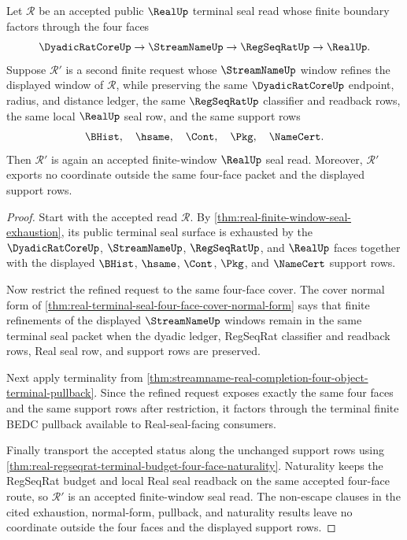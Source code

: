 \begin{theorem}
\label{thm:real-finite-window-seal-refinement-monotonicity}
Let $\mathcal R$ be an accepted public $\RealUp$ terminal seal read whose
finite boundary factors through the four faces
$$
\DyadicRatCoreUp \to \StreamNameUp \to \RegSeqRatUp \to \RealUp.
$$
Suppose $\mathcal R'$ is a second finite request whose $\StreamNameUp$ window
refines the displayed window of $\mathcal R$, while preserving the same
$\DyadicRatCoreUp$ endpoint, radius, and distance ledger, the same
$\RegSeqRatUp$ classifier and readback rows, the same local $\RealUp$ seal
row, and the same support rows
$$
\BHist,\quad \hsame,\quad \Cont,\quad \Pkg,\quad \NameCert.
$$
Then $\mathcal R'$ is again an accepted finite-window $\RealUp$ seal read.
Moreover, $\mathcal R'$ exports no coordinate outside the same four-face
packet and the displayed support rows.
\end{theorem}
\begin{proof}
Start with the accepted read $\mathcal R$. By
\autoref{thm:real-finite-window-seal-exhaustion}, its public terminal seal
surface is exhausted by the $\DyadicRatCoreUp$, $\StreamNameUp$,
$\RegSeqRatUp$, and $\RealUp$ faces together with the displayed $\BHist$,
$\hsame$, $\Cont$, $\Pkg$, and $\NameCert$ support rows.

Now restrict the refined request to the same four-face cover. The cover normal
form of \autoref{thm:real-terminal-seal-four-face-cover-normal-form} says that
finite refinements of the displayed $\StreamNameUp$ windows remain in the
same terminal seal packet when the dyadic ledger, RegSeqRat classifier and
readback rows, Real seal row, and support rows are preserved.

Next apply terminality from
\autoref{thm:streamname-real-completion-four-object-terminal-pullback}. Since
the refined request exposes exactly the same four faces and the same support
rows after restriction, it factors through the terminal finite BEDC pullback
available to Real-seal-facing consumers.

Finally transport the accepted status along the unchanged support rows using
\autoref{thm:real-regseqrat-terminal-budget-four-face-naturality}. Naturality
keeps the RegSeqRat budget and local Real seal readback on the same accepted
four-face route, so $\mathcal R'$ is an accepted finite-window seal read. The
non-escape clauses in the cited exhaustion, normal-form, pullback, and
naturality results leave no coordinate outside the four faces and the
displayed support rows.
\end{proof}

